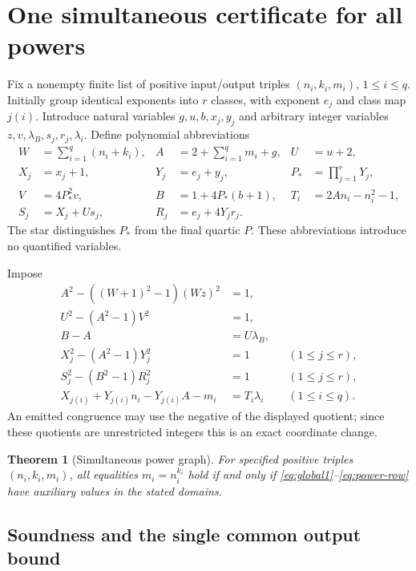 \documentclass[11pt]{article}
\newtheorem{theorem}{Theorem}[section]
\theoremstyle{definition}
\theoremstyle{remark}
\begin{document}
\section{One simultaneous certificate for all powers}\label{sec:batch}

Fix a nonempty finite list of positive input/output triples
$(n_i,k_i,m_i)$, $1\le i\le q$. Initially group identical exponents into
$r$ classes, with exponent $e_j$ and class map $j(i)$.
Introduce natural variables $g,u,b,x_j,y_j$ and arbitrary integer
variables $z,v,\lambda_B,s_j,r_j,\lambda_i$. Define polynomial
abbreviations
\begin{align}
 W&=\sum_{i=1}^q(n_i+k_i),&
 A&=2+\sum_{i=1}^q m_i+g,&U&=u+2,\label{eq:shared-abbr1}\\
 X_j&=x_j+1,&Y_j&=e_j+y_j,&
 P_*&=\prod_{j=1}^rY_j,\label{eq:shared-abbr2}\\
 V&=4P_*^2v,&B&=1+4P_*(b+1),&
 T_i&=2An_i-n_i^2-1,\label{eq:shared-abbr3}\\
 S_j&=X_j+Us_j,&R_j&=e_j+4Y_jr_j.\label{eq:shared-abbr4}
\end{align}
The star distinguishes $P_*$ from the final quartic $P$.
These abbreviations introduce no quantified variables.

Impose
\begin{align}
 A^2-((W+1)^2-1)(Wz)^2&=1,\label{eq:global1}\\
 U^2-(A^2-1)V^2&=1,\label{eq:global2}\\
 B-A&=U\lambda_B,\label{eq:global3}\\
 X_j^2-(A^2-1)Y_j^2&=1 &&(1\le j\le r),\label{eq:local1}\\
 S_j^2-(B^2-1)R_j^2&=1 &&(1\le j\le r),\label{eq:local2}\\
 X_{j(i)}+Y_{j(i)}n_i-Y_{j(i)}A-m_i&=T_i\lambda_i
 &&(1\le i\le q).\label{eq:power-row}
\end{align}
An emitted congruence may use the negative of the displayed quotient;
since these quotients are unrestricted integers this is an exact
coordinate change.

\begin{theorem}[Simultaneous power graph]\label{thm:batch}
For specified positive triples $(n_i,k_i,m_i)$, all equalities
$m_i=n_i^{k_i}$ hold if and only if
\eqref{eq:global1}--\eqref{eq:power-row} have auxiliary values in the
stated domains.
\end{theorem}

\subsection{Soundness and the single common output bound}
\end{document}
